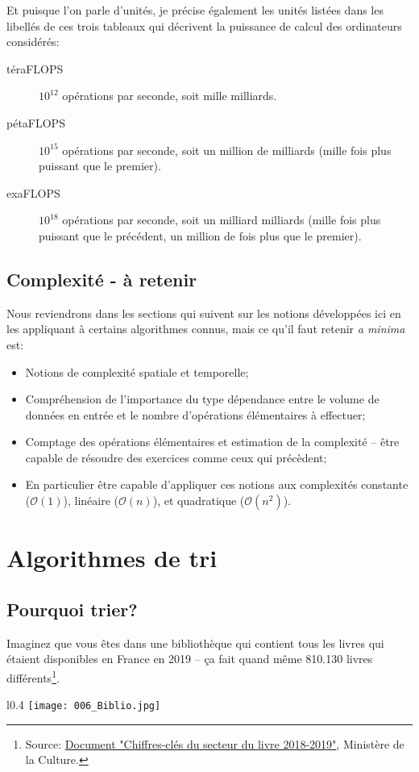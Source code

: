 \documentclass[12pt]{article}
\begin{document}
	Et puisque l'on parle d'unités, je précise également les unités listées dans les libellés de ces trois tableaux qui décrivent la puissance de calcul des ordinateurs considérés:
	\begin{description}
		\item[téraFLOPS] $10^{12}$ opérations par seconde, soit mille milliards.
		\item[pétaFLOPS] $10^{15}$ opérations par seconde, soit un million de milliards (mille fois plus puissant que le premier).
		\item[exaFLOPS] $10^{18}$ opérations par seconde, soit un milliard milliards (mille fois plus puissant que le précédent, un million de fois plus que le premier).
	\end{description}
	
	\subsection{Complexité - à retenir}
	\begin{MonRet}
		Nous reviendrons dans les sections qui suivent sur les notions développées ici en les appliquant à certains algorithmes connus, mais ce qu'il faut retenir \textit{a minima} est:
		\begin{itemize}
			\item Notions de complexité spatiale et temporelle;
			\item Compréhension de l'importance du type dépendance entre le volume de données en entrée et le nombre d'opérations élémentaires à effectuer;
			\item Comptage des opérations élémentaires et estimation de la complexité -- être capable de résoudre des exercices comme ceux qui précèdent;
			\item En particulier être capable d'appliquer ces notions aux complexités constante ($\mathcal{O}(1)$), linéaire ($\mathcal{O}(n)$), et quadratique (\texttt{$\mathcal{O}(n^2)$}).
		\end{itemize}
	\end{MonRet}

	\pagebreak
	\section{Algorithmes de tri}
	\subsection{Pourquoi trier?}
	Imaginez que vous êtes dans une bibliothèque qui contient tous les livres qui étaient disponibles en France en 2019 -- ça fait quand même 810.130 livres différents\footnote{Source: \href{https://www.culture.gouv.fr/content/download/268286/3121285?v=1}{Document "Chiffres-clés du secteur du livre 2018-2019"}, Ministère de la Culture.}.
	\begin{wrapfigure}{l}{0.4\textwidth}
		\vspace{10pt} %
		\texttt{[image: 006\_Biblio.jpg]}
	\end{wrapfigure}
	
\end{document}
